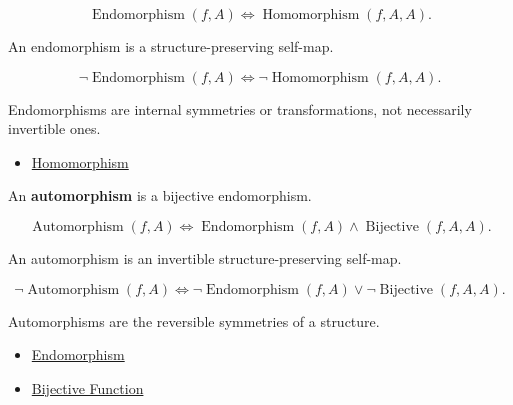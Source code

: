 \begin{remark*}
\[
\operatorname{Endomorphism}(f,A)
\Longleftrightarrow
\operatorname{Homomorphism}(f,A,A).
\]
\end{remark*}

\begin{remark*}
An endomorphism is a structure-preserving self-map.
\end{remark*}

\begin{remark*}
\[
\neg\operatorname{Endomorphism}(f,A)
\Longleftrightarrow
\neg\operatorname{Homomorphism}(f,A,A).
\]
\end{remark*}

\begin{remark*}[Interpretation]
Endomorphisms are internal symmetries or transformations, not necessarily
invertible ones.
\end{remark*}

\begin{dependencies}
\begin{itemize}
  \item \hyperref[def:algebraic-homomorphism]{Homomorphism}
\end{itemize}
\end{dependencies}

\begin{definition}[Automorphism]
\label{def:automorphism}
An \textbf{automorphism} is a bijective endomorphism.
\end{definition}

\begin{remark*}
\[
\operatorname{Automorphism}(f,A)
\Longleftrightarrow
\operatorname{Endomorphism}(f,A)
\land
\operatorname{Bijective}(f,A,A).
\]
\end{remark*}

\begin{remark*}
An automorphism is an invertible structure-preserving self-map.
\end{remark*}

\begin{remark*}
\[
\neg\operatorname{Automorphism}(f,A)
\Longleftrightarrow
\neg\operatorname{Endomorphism}(f,A)
\lor
\neg\operatorname{Bijective}(f,A,A).
\]
\end{remark*}

\begin{remark*}[Interpretation]
Automorphisms are the reversible symmetries of a structure.
\end{remark*}

\begin{dependencies}
\begin{itemize}
  \item \hyperref[def:endomorphism]{Endomorphism}
  \item \hyperref[def:alg-bijective]{Bijective Function}
\end{itemize}
\end{dependencies}

